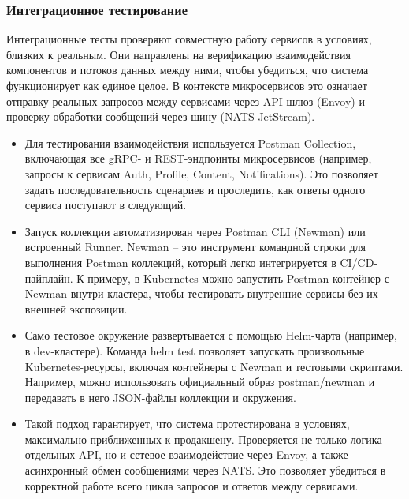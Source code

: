 \subsubsection*{Интеграционное тестирование}
Интеграционные тесты проверяют совместную работу сервисов в условиях, близких к реальным. Они направлены на верификацию взаимодействия компонентов и потоков данных между ними, чтобы убедиться, что система функционирует как единое целое. В контексте микросервисов это означает отправку реальных запросов между сервисами через API-шлюз (Envoy) и проверку обработки сообщений через шину (NATS JetStream).
\begin{itemize}
    \item Для тестирования взаимодействия используется Postman Collection, включающая все gRPC- и REST-эндпоинты микросервисов (например, запросы к сервисам Auth, Profile, Content, Notifications). Это позволяет задать последовательность сценариев и проследить, как ответы одного сервиса поступают в следующий.
    \item Запуск коллекции автоматизирован через Postman CLI (Newman) или встроенный Runner. Newman – это инструмент командной строки для выполнения Postman коллекций, который легко интегрируется в CI/CD-пайплайн. К примеру, в Kubernetes можно запустить Postman-контейнер с Newman внутри кластера, чтобы тестировать внутренние сервисы без их внешней экспозиции.
    \item Само тестовое окружение развертывается с помощью Helm-чарта (например, в dev-кластере). Команда helm test позволяет запускать произвольные Kubernetes-ресурсы, включая контейнеры с Newman и тестовыми скриптами. Например, можно использовать официальный образ postman/newman и передавать в него JSON-файлы коллекции и окружения.
    \item Такой подход гарантирует, что система протестирована в условиях, максимально приближенных к продакшену. Проверяется не только логика отдельных API, но и сетевое взаимодействие через Envoy, а также асинхронный обмен сообщениями через NATS. Это позволяет убедиться в корректной работе всего цикла запросов и ответов между сервисами.
\end{itemize}

